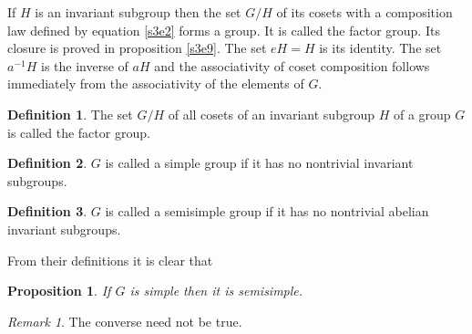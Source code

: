 \documentclass{article}
\theoremstyle{plain}
\numberwithin{thm}{section}
\theoremstyle{plain}
\newtheorem{prop}{Proposition}
\numberwithin{prop}{section}
\theoremstyle{definition}
\newtheorem{defn}{Definition}
\numberwithin{defn}{section}
\theoremstyle{remark}
\newtheorem*{rem}{Remark}
\numberwithin{equation}{section}
\begin{document}
If $H$ is an invariant subgroup then the set $G/H$ of its cosets with a 
composition law defined by equation \eqref{s3e2} forms a group. It is called
the factor group. Its closure is proved in proposition \eqref{s3e9}. The set
$eH = H$ is its identity. The set $a^{-1}H$ is the inverse of $aH$ and the
associativity of coset composition follows immediately from the associativity
of the elements of $G$.

\begin{defn}\label{s3d5}
The set $G/H$ of all cosets of an invariant subgroup $H$ of a group $G$ is
called the factor group.
\end{defn}

\begin{defn}\label{s3d6}
$G$ is called a simple group if it has no nontrivial invariant subgroups.
\end{defn}

\begin{defn}\label{s3d7}
$G$ is called a semisimple group if it has no nontrivial abelian invariant 
subgroups.
\end{defn}

From their definitions it is clear that
\begin{prop}\label{s3p10}
If $G$ is simple then it is semisimple.
\end{prop}

\begin{rem}
The converse need not be true.
\end{rem}
\end{document}
